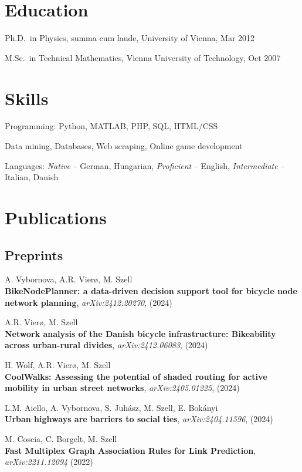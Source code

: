 \documentclass[10pt,a4paper]{article}
\renewenvironment{itemize}{
  \begin{list}{}{
    \setlength{\leftmargin}{1.5em}
    \setlength{\itemsep}{0.25em}
    \setlength{\parskip}{0pt}
    \setlength{\parsep}{0.25em}
  }
}{
  \end{list}
}
\begin{document}

\section*{Education}

\begin{itemize}
  \item Ph.D.~in Physics, summa cum laude, University of Vienna, Mar 2012
  \item M.Sc.~in Technical Mathematics, Vienna University of Technology, Oct 2007
\end{itemize}

\section*{Skills}
\begin{itemize}
\item{Programming: Python, MATLAB, PHP, SQL, HTML/CSS}
\item{Data mining, Databases, Web scraping, Online game development}
\item{Languages: \emph{Native} -- German, Hungarian, \emph{Proficient} -- English, \emph{Intermediate} -- Italian, Danish}
\end{itemize}


\section*{Publications}

\subsection*{Preprints}
\begin{itemize}
\setlength\itemsep{1em}

\item A. Vybornova, A.R. Vierø, M. Szell\\
\textbf{BikeNodePlanner: a data-driven decision support tool for bicycle node network planning},
\textit{arXiv:2412.20270}, (2024)
\item A.R. Vierø, M. Szell\\
\textbf{Network analysis of the Danish bicycle infrastructure: Bikeability across urban-rural divides},
\textit{arXiv:2412.06083}, (2024)
\item H. Wolf, A.R. Vierø, M. Szell\\
    \textbf{CoolWalks: Assessing the potential of shaded routing for active mobility in urban street networks}, \textit{arXiv:2405.01225}, (2024)
\item L.M. Aiello, A. Vybornova, S. Juhász, M. Szell, E. Bokányi\\
    \textbf{Urban highways are barriers to social ties}, \textit{arXiv:2404.11596}, (2024)
\item M. Coscia, C. Borgelt, M. Szell\\
    \textbf{Fast Multiplex Graph Association Rules for Link Prediction}, \textit{arXiv:2211.12094} (2022)
\end{itemize}
\end{document}

